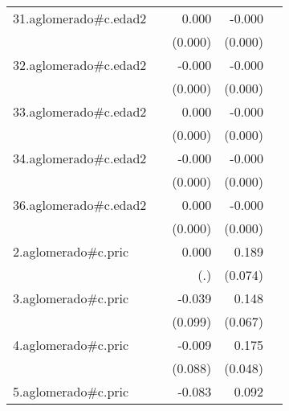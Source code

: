 {\begin{longtable}{l*{4}{D{.}{.}{-1}}}
\addlinespace
31.aglomerado#c.edad2&                     &       0.000         &      -0.000         &                     \\
            &                     &     (0.000)         &     (0.000)         &                     \\
\addlinespace
32.aglomerado#c.edad2&                     &      -0.000         &      -0.000\sym{***}&                     \\
            &                     &     (0.000)         &     (0.000)         &                     \\
\addlinespace
33.aglomerado#c.edad2&                     &       0.000         &      -0.000\sym{***}&                     \\
            &                     &     (0.000)         &     (0.000)         &                     \\
\addlinespace
34.aglomerado#c.edad2&                     &      -0.000         &      -0.000\sym{***}&                     \\
            &                     &     (0.000)         &     (0.000)         &                     \\
\addlinespace
36.aglomerado#c.edad2&                     &       0.000         &      -0.000         &                     \\
            &                     &     (0.000)         &     (0.000)         &                     \\
\addlinespace
2.aglomerado#c.pric&                     &       0.000         &       0.189\sym{*}  &                     \\
            &                     &         (.)         &     (0.074)         &                     \\
\addlinespace
3.aglomerado#c.pric&                     &      -0.039         &       0.148\sym{*}  &                     \\
            &                     &     (0.099)         &     (0.067)         &                     \\
\addlinespace
4.aglomerado#c.pric&                     &      -0.009         &       0.175\sym{***}&                     \\
            &                     &     (0.088)         &     (0.048)         &                     \\
\addlinespace
5.aglomerado#c.pric&                     &      -0.083         &       0.092         &                     \\

\end{longtable}}
